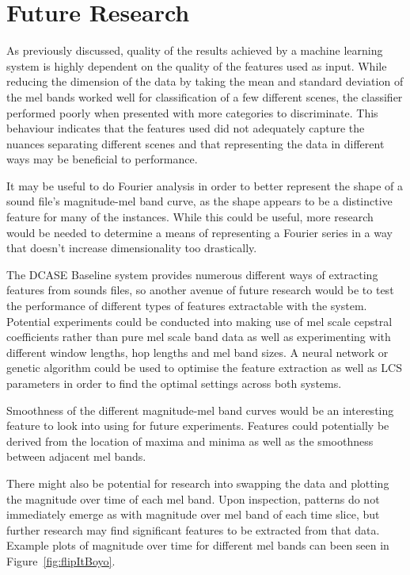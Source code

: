 \documentclass[11pt]{article}
\begin{document}
\pagebreak
\section{Future Research}

As previously discussed, quality of the results achieved by a machine learning system is highly dependent on the quality of the features used as input. While reducing the dimension of the data by taking the mean and standard deviation of the mel bands worked well for classification of a few different scenes, the classifier performed poorly when presented with more categories to discriminate. This behaviour indicates that the features used did not adequately capture the nuances separating different scenes and that representing the data in different ways may be beneficial to performance.

It may be useful to do Fourier analysis in order to better represent the shape of a sound file's magnitude-mel band curve, as the shape appears to be a distinctive feature for many of the instances. While this could be useful, more research would be needed to determine a means of representing a Fourier series in a way that doesn't increase dimensionality too drastically. 

The DCASE Baseline system provides numerous different ways of extracting features from sounds files, so another avenue of future research would be to test the performance of different types of features extractable with the system. Potential experiments could be conducted into making use of mel scale cepstral coefficients rather than pure mel scale band data as well as experimenting with different window lengths, hop lengths and mel band sizes. A neural network or genetic algorithm could be used to optimise the feature extraction as well as LCS parameters in order to find the optimal settings across both systems.
 
Smoothness of the different magnitude-mel band curves would be an interesting feature to look into using for future experiments. Features could potentially be derived from the location of maxima and minima as well as the smoothness between adjacent mel bands.

There might also be potential for research into swapping the data and plotting the magnitude over time of each mel band. Upon inspection, patterns do not immediately emerge as with magnitude over mel band of each time slice, but further research may find significant features to be extracted from that data. Example plots of magnitude over time for different mel bands can been seen in Figure~\ref{fig:flipItBoyo}.
\end{document}

